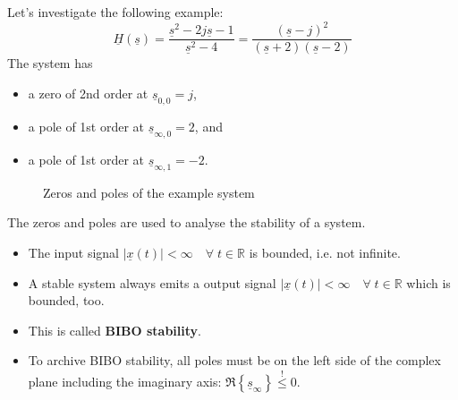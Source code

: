 \begin{refsection}
Let's investigate the following example:
\begin{equation}
	\underline{H}(\underline{s}) = \frac{\underline{s}^2 - 2 j \underline{s} - 1}{\underline{s}^2 - 4} = \frac{(\underline{s} - j)^2}{(\underline{s} + 2) (\underline{s} - 2)}
\end{equation}
The system has
\begin{itemize}
	\item a zero of 2nd order at $\underline{s}_{0,0} = j$,
	\item a pole of 1st order at $\underline{s}_{\infty,0} = 2$, and
	\item a pole of 1st order at $\underline{s}_{\infty,1} = -2$.
\end{itemize}
\begin{figure}[H]
	\centering
	\caption{Zeros and poles of the example system}
\end{figure}

The zeros and poles are used to analyse the stability of a system.
\begin{itemize}
	\item The input signal $|\underline{x}(t)| < \infty \quad \forall \; t \in \mathbb{R}$ is bounded, i.e. not infinite.
	\item A stable system always emits a output signal $|\underline{x}(t)| < \infty \quad \forall \; t \in \mathbb{R}$ which is bounded, too.
	\item This is called  \textbf{\ac{BIBO} stability}.
	\item To archive \ac{BIBO} stability, all poles must be on the left side of the complex plane including the imaginary axis: $\Re\left\{\underline{s}_\infty\right\} \stackrel{!}{\leq} 0$.
\end{itemize}


\end{refsection}
